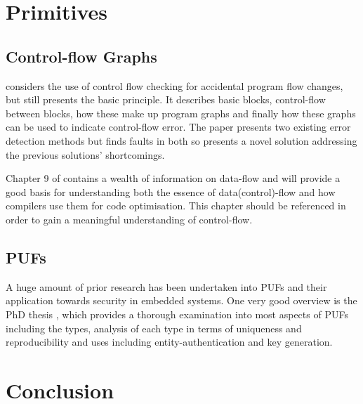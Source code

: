 \section{Primitives}

\subsection{Control-flow Graphs}

\cite{Goloubeva2003} considers the use of control flow checking for accidental program flow changes, but still presents the basic principle. It describes basic blocks, control-flow between blocks, how these make up program graphs and finally how these graphs can be used to indicate control-flow error. The paper presents two existing error detection methods but finds faults in both so presents a novel solution addressing the previous solutions' shortcomings.

Chapter 9 of \cite{AhoAlfredV.2014C:pt} contains a wealth of information on data-flow and will provide a good basis for understanding both the essence of data(control)-flow and how compilers use them for code optimisation. This chapter should be referenced in order to gain a meaningful understanding of control-flow.


\subsection{PUFs}

A huge amount of prior research has been undertaken into PUFs and their application towards security in embedded systems. One very good overview is the PhD thesis \cite{Maes2012}, which provides a thorough examination into most aspects of PUFs including the types, analysis of each type in terms of uniqueness and reproducibility and uses including entity-authentication and key generation.

\section{Conclusion}

